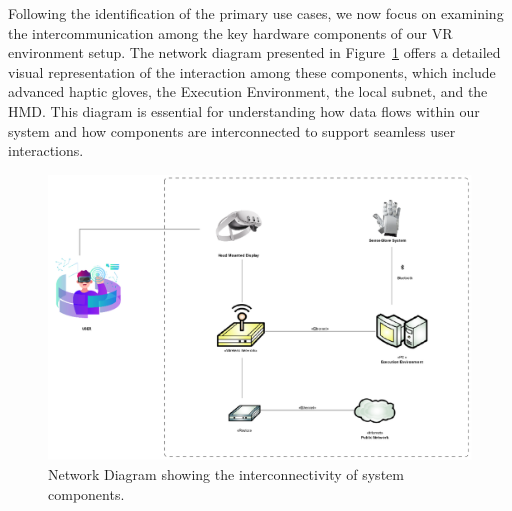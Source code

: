 Following the identification of the primary use cases, we now focus on examining the intercommunication among the key hardware components of our \ac{VR} environment setup. The network diagram presented in Figure~\ref{fig:NetworkDiagram} offers a detailed visual representation of the interaction among these components, which include advanced haptic gloves, the Execution Environment, the local subnet, and the \ac{HMD}. This diagram is essential for understanding how data flows within our system and how components are interconnected to support seamless user interactions.

\begin{figure}[htbp]
\centering
\includegraphics[width=1\textwidth]{Development/networkDiagram.png}
    \captionsetup{justification=centering}

\caption{Network Diagram showing the interconnectivity of system components.}
\label{fig:NetworkDiagram}
\end{figure}

\clearpage

